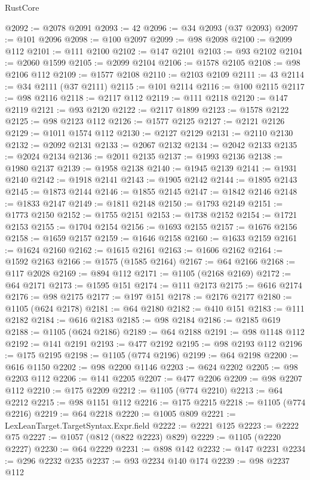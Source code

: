 \begin{lexlean}{RustCore}
\begin{coremodule}
@2092 := @2078 @2091
@2093 := 42
@2096 := @34 @2093 (@37 @2093)
@2097 := @101 @2096
@2098 := @100 @2097
@2099 := @98 @2098
@2100 := @2099 @112
@2101 := @111 @2100
@2102 := @147 @2101
@2103 := @93 @2102
@2104 := @2060 @1599
@2105 := @2099 @2104
@2106 := @1578 @2105
@2108 := @98 @2106 @112
@2109 := @1577 @2108
@2110 := @2103 @2109
@2111 := 43
@2114 := @34 @2111 (@37 @2111)
@2115 := @101 @2114
@2116 := @100 @2115
@2117 := @98 @2116
@2118 := @2117 @112
@2119 := @111 @2118
@2120 := @147 @2119
@2121 := @93 @2120
@2122 := @2117 @1899
@2123 := @1578 @2122
@2125 := @98 @2123 @112
@2126 := @1577 @2125
@2127 := @2121 @2126
@2129 := @1011 @1574 @112
@2130 := @2127 @2129
@2131 := @2110 @2130
@2132 := @2092 @2131
@2133 := @2067 @2132
@2134 := @2042 @2133
@2135 := @2024 @2134
@2136 := @2011 @2135
@2137 := @1993 @2136
@2138 := @1980 @2137
@2139 := @1958 @2138
@2140 := @1945 @2139
@2141 := @1931 @2140
@2142 := @1918 @2141
@2143 := @1905 @2142
@2144 := @1895 @2143
@2145 := @1873 @2144
@2146 := @1855 @2145
@2147 := @1842 @2146
@2148 := @1833 @2147
@2149 := @1811 @2148
@2150 := @1793 @2149
@2151 := @1773 @2150
@2152 := @1755 @2151
@2153 := @1738 @2152
@2154 := @1721 @2153
@2155 := @1704 @2154
@2156 := @1693 @2155
@2157 := @1676 @2156
@2158 := @1659 @2157
@2159 := @1646 @2158
@2160 := @1633 @2159
@2161 := @1624 @2160
@2162 := @1615 @2161
@2163 := @1606 @2162
@2164 := @1592 @2163
@2166 := @1575 (@1585 @2164)
@2167 := @64 @2166
@2168 := @117 @2028
@2169 := @894 @112
@2171 := @1105 (@2168 @2169)
@2172 := @64 @2171
@2173 := @1595 @151
@2174 := @111 @2173
@2175 := @616 @2174
@2176 := @98 @2175
@2177 := @197 @151
@2178 := @2176 @2177
@2180 := @1105 (@624 @2178)
@2181 := @64 @2180
@2182 := @410 @151
@2183 := @111 @2182
@2184 := @616 @2183
@2185 := @98 @2184
@2186 := @2185 @619
@2188 := @1105 (@624 @2186)
@2189 := @64 @2188
@2191 := @98 @1148 @112
@2192 := @141 @2191
@2193 := @477 @2192
@2195 := @98 @2193 @112
@2196 := @175 @2195
@2198 := @1105 (@774 @2196)
@2199 := @64 @2198
@2200 := @616 @1150
@2202 := @98 @2200 @1146
@2203 := @624 @2202
@2205 := @98 @2203 @112
@2206 := @141 @2205
@2207 := @477 @2206
@2209 := @98 @2207 @112
@2210 := @175 @2209
@2212 := @1105 (@774 @2210)
@2213 := @64 @2212
@2215 := @98 @1151 @112
@2216 := @175 @2215
@2218 := @1105 (@774 @2216)
@2219 := @64 @2218
@2220 := @1005 @809
@2221 := LexLeanTarget.TargetSyntax.Expr.field
@2222 := @2221 @125
@2223 := @2222 @75
@2227 := @1057 (@812 (@822 @2223) @829)
@2229 := @1105 (@2220 @2227)
@2230 := @64 @2229
@2231 := @898 @142
@2232 := @147 @2231
@2234 := @296 @2232 @235
@2237 := @93 @2234 @140 @174
@2239 := @98 @2237 @112

\end{coremodule}
\end{lexlean}
